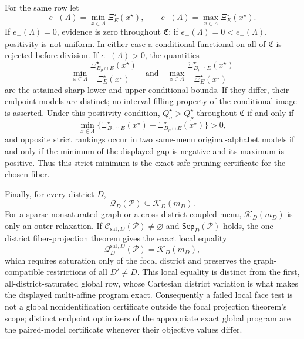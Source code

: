 For the same row let
\[
e_-(\Lambda)=\min_{x\in\Lambda}\Xi_E^\star(x^\star),
\qquad
e_+(\Lambda)=\max_{x\in\Lambda}\Xi_E^\star(x^\star).
\]
If \(e_+(\Lambda)=0\), evidence is zero throughout \(\mathfrak C\); if \(e_-(\Lambda)=0<e_+(\Lambda)\), positivity is not uniform. In either case a conditional functional on all of \(\mathfrak C\) is rejected before division. If \(e_-(\Lambda)>0\), the quantities
\[
\min_{x\in\Lambda}
\frac{\Xi_{B_\rho\cap E}^\star(x^\star)}{\Xi_E^\star(x^\star)}
\quad\text{and}\quad
\max_{x\in\Lambda}
\frac{\Xi_{B_\rho\cap E}^\star(x^\star)}{\Xi_E^\star(x^\star)}
\]
are the attained sharp lower and upper conditional bounds. If they differ, their endpoint models are distinct; no interval-filling property of the conditional image is asserted. Under this positivity condition, \(Q_\sigma^\star>Q_\rho^\star\) throughout \(\mathfrak C\) if and only if
\[
\min_{x\in\Lambda}
\{\Xi_{B_\sigma\cap E}^\star(x^\star)-\Xi_{B_\rho\cap E}^\star(x^\star)\}>0,
\]
and opposite strict rankings occur in two same-menu original-alphabet models if and only if the minimum of the displayed gap is negative and its maximum is positive. Thus this strict minimum is the exact safe-pruning certificate for the chosen fiber.

Finally, for every district \(D\),
\[
\mathcal Q_D(\mathcal P)\subseteq\mathcal K_D(m_D).
\]
For a sparse nonsaturated graph or a cross-district-coupled menu, \(\mathcal K_D(m_D)\) is only an outer relaxation. If \(\mathcal C_{\mathrm{sat},D}(\mathcal P)\ne\varnothing\) and \(\mathsf{Sep}_D(\mathcal P)\) holds, the one-district fiber-projection theorem gives the exact local equality
\[
\mathcal Q_D^{\mathrm{sat},D}(\mathcal P)=\mathcal K_D(m_D),
\]
which requires saturation only of the focal district and preserves the graph-compatible restrictions of all \(D'\ne D\). This local equality is distinct from the first, all-district-saturated global row, whose Cartesian district variation is what makes the displayed multi-affine program exact. Consequently a failed local face test is not a global nonidentification certificate outside the focal projection theorem's scope; distinct endpoint optimizers of the appropriate exact global program are the paired-model certificate whenever their objective values differ.